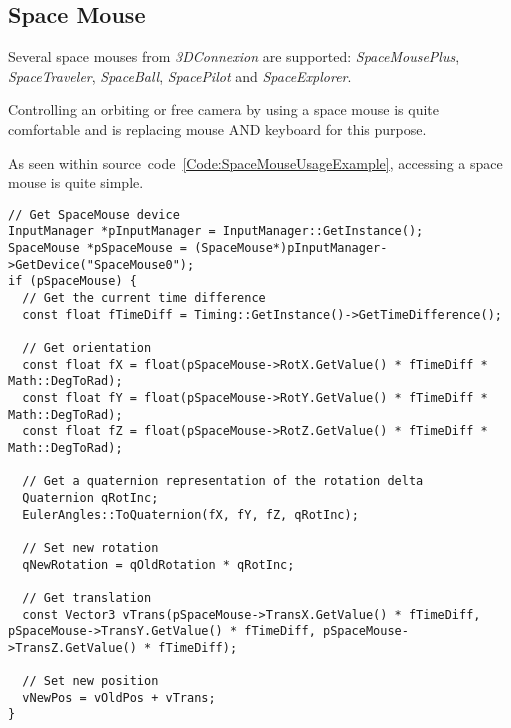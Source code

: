 \subsection{Space Mouse}
Several space mouses from \emph{3DConnexion} are supported: \emph{SpaceMousePlus}, \emph{SpaceTraveler}, \emph{SpaceBall}, \emph{SpacePilot} and \emph{SpaceExplorer}.

Controlling an orbiting or free camera by using a space mouse is quite comfortable and is replacing mouse AND keyboard for this purpose.

As seen within source~code~\ref{Code:SpaceMouseUsageExample}, accessing a space mouse is quite simple.
\begin{lstlisting}[float=htb,label=Code:SpaceMouseUsageExample,caption={Space mouse usage example}]
// Get SpaceMouse device
InputManager *pInputManager = InputManager::GetInstance();
SpaceMouse *pSpaceMouse = (SpaceMouse*)pInputManager->GetDevice("SpaceMouse0");
if (pSpaceMouse) {
  // Get the current time difference
  const float fTimeDiff = Timing::GetInstance()->GetTimeDifference();

  // Get orientation
  const float fX = float(pSpaceMouse->RotX.GetValue() * fTimeDiff * Math::DegToRad);
  const float fY = float(pSpaceMouse->RotY.GetValue() * fTimeDiff * Math::DegToRad);
  const float fZ = float(pSpaceMouse->RotZ.GetValue() * fTimeDiff * Math::DegToRad);

  // Get a quaternion representation of the rotation delta
  Quaternion qRotInc;
  EulerAngles::ToQuaternion(fX, fY, fZ, qRotInc);

  // Set new rotation
  qNewRotation = qOldRotation * qRotInc;

  // Get translation
  const Vector3 vTrans(pSpaceMouse->TransX.GetValue() * fTimeDiff, pSpaceMouse->TransY.GetValue() * fTimeDiff, pSpaceMouse->TransZ.GetValue() * fTimeDiff);

  // Set new position
  vNewPos = vOldPos + vTrans;
}
\end{lstlisting}
